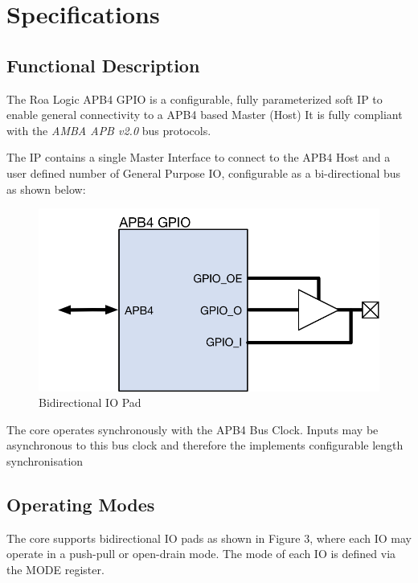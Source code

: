 \chapter{Specifications} \label{specifications}

\section{Functional Description}\label{functional-description}

The Roa Logic APB4 GPIO is a configurable, fully parameterized soft IP to
enable general connectivity to a APB4 based Master (Host) It is fully
compliant with the \emph{AMBA APB v2.0} bus protocols.

The IP contains a single Master Interface to connect to the APB4 Host
and a user defined number of General Purpose IO, configurable as a
bi-directional bus as shown below:

\begin{figure}[tbh]
	\centering
	\includegraphics{assets/img/apb4-gpio-sys.png}
	\caption{Bidirectional IO Pad}
	\label{fig:apb4-gpio-sys}
\end{figure}

The core operates synchronously with the APB4 Bus Clock. Inputs may be
asynchronous to this bus clock and therefore the implements configurable
length synchronisation

\section{Operating Modes}\label{operating-modes}

The core supports bidirectional IO pads as shown in Figure 3, where each
IO may operate in a push-pull or open-drain mode. The mode of each IO is
defined via the MODE register.

